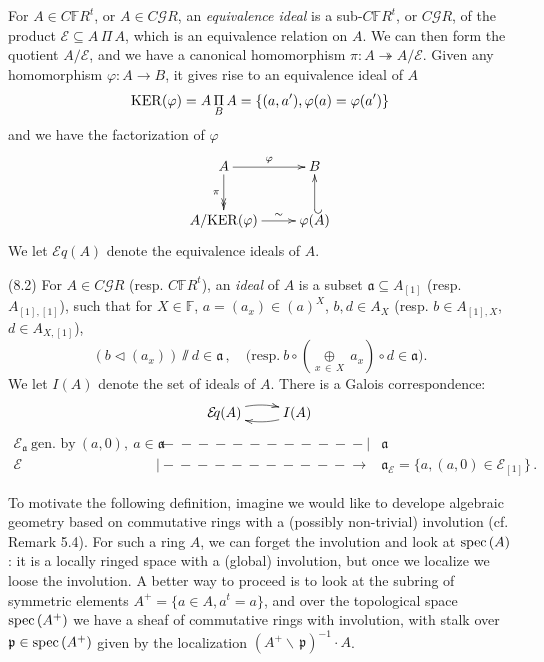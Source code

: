 \documentclass[leqno]{article}
\numberwithin{equation}{section}
\begin{document}
For $A \in C{\mathbb F} R^t$, or $A \in C {\mathcal G} R$, an {\it equivalence ideal} is a sub-$C{\mathbb F} R^t$, or $C {\mathcal G} R$, of the product ${\mathcal E} \subseteq A \, \Pi \, A$, which is an equivalence relation on $A$. We can then form the quotient $A/{\mathcal E}$, and we have a canonical homomorphism $\pi : A \twoheadrightarrow A/{\mathcal E}$. Given any homomorphism $\varphi : A \to B$, it gives rise to an equivalence ideal of $A$
$$
{\rm KER} (\varphi) = A \, \underset{B}{\Pi} \, A = \{ (a,a') , \varphi (a) = \varphi (a') \}
$$
and we have the factorization of $\varphi$
\begin{equation}
\label{eq81}
\xymatrix{
A \ar[r]^{\varphi} \ar@{->>}[d]_-{\pi} &B \\
A/{\rm KER} (\varphi) \ar[r]^-{\sim} &\varphi (A) \ar@{_{(}->}[u]
}
\end{equation}
We let ${\mathcal E}\!q (A)$ denote the equivalence ideals of $A$.

\bigskip

\noindent (8.2)  For $A \in C {\mathcal G} R$ (resp. $C{\mathbb F} R^t$), an {\it ideal} of $A$ is a subset ${\mathfrak a} \subseteq A_{[1]}$ (resp. $A_{[1],[1]}$), such that for $X \in {\mathbb F}$, $a = (a_x) \in (a)^X$, $b,d \in A_X$ (resp. $b \in A_{[1], X}$, $d \in A_{X , [1]}$),
$$
(b \lhd (a_x)) \sslash d \in {\mathfrak a} \, , \quad \mbox{(resp.} \ b \circ \left( \underset{x \, \in \, X}{\oplus} \ a_x \right) \circ d \in {\mathfrak a}).
$$
We let $I(A)$ denote the set of ideals of $A$. There is a Galois correspondence:
\setcounter{equation}{2}
\begin{equation}
\label{eq83}
\xymatrix{
{\mathcal E}\!q (A) \ar@/^/[r] &I(A) \ar@/^/[l] 
}
\end{equation}
\begin{eqnarray}
{\mathcal E}_{\mathfrak a} \ \mbox{gen. by} \ (a,0) , \ a \in {\mathfrak a} &\leftarrow\!\!\!-\!\!\!-\!\!\!-\!\!\!-\!\!\!-\!\!\!-\!\!\!-\!\!\!-\!\!\!-\!\!\!-\!\!\!-\!| &{\mathfrak a} \nonumber \\
{\mathcal E} &|\!\!\!-\!\!\!-\!\!\!-\!\!\!-\!\!\!-\!\!\!-\!\!\!-\!\!\!-\!\!\!-\!\!\!-\!\!\!-\!\!\!\rightarrow &{\mathfrak a}_{\mathcal E} = \{ a , (a,0) \in {\mathcal E}_{[1]} \} \, . \nonumber
\end{eqnarray}

To motivate the following definition, imagine we would like to develope algebraic geometry based on commutative rings with a (possibly non-trivial) involution (cf. Remark 5.4). For such a ring $A$, we can forget the involution and look at ${\rm spec} \, (A)$: it is a locally ringed space with a (global) involution, but once we localize we loose the involution. A better way to proceed is to look at the subring of symmetric elements $A^+ = \{ a \in A , a^t = a \}$, and over the topological space ${\rm spec} \, (A^+)$ we have a sheaf of commutative rings with involution, with stalk over ${\mathfrak p} \in {\rm spec} \, (A^+)$ given by the localization $(A^+ \backslash \, {\mathfrak p})^{-1} \cdot A$.
\end{document}
